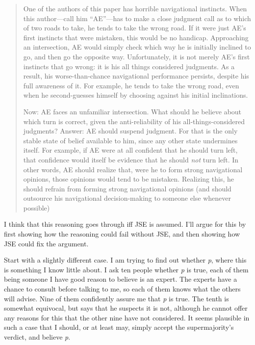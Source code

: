 \documentclass[
  10pt,
  letterpaper,
  DIV=11,
  numbers=noendperiod,
  twoside]{scrartcl}
\begin{document}
\begin{quote}
One of the authors of this paper has horrible navigational instincts.
When this author---call him ``AE''---has to make a close judgment call
as to which of two roads to take, he tends to take the wrong road. If it
were just AE's first instincts that were mistaken, this would be no
handicap. Approaching an intersection, AE would simply check which way
he is initially inclined to go, and then go the opposite way.
Unfortunately, it is not merely AE's first instincts that go wrong: it
is his all things considered judgments. As a result, his
worse-than-chance navigational performance persists, despite his full
awareness of it. For example, he tends to take the wrong road, even when
he second-guesses himself by choosing against his initial inclinations.

Now: AE faces an unfamiliar intersection. What should he believe about
which turn is correct, given the anti-reliability of his
all-things-considered judgments? Answer: AE should suspend judgment. For
that is the only stable state of belief available to him, since any
other state undermines itself. For example, if AE were at all confident
that he should turn left, that confidence would itself be evidence that
he should \emph{not} turn left. In other words, AE should realize that,
were he to form strong navigational opinions, those opinions would tend
to be mistaken. Realizing this, he should refrain from forming strong
navigational opinions (and should outsource his navigational
decision-making to someone else whenever possible)
\end{quote}

I think that this reasoning goes through iff JSE is assumed. I'll argue
for this by first showing how the reasoning could fail without JSE, and
then showing how JSE could fix the argument.

Start with a slightly different case. I am trying to find out whether
\emph{p}, where this is something I know little about. I ask ten people
whether \emph{p} is true, each of them being someone I have good reason
to believe is an expert. The experts have a chance to consult before
talking to me, so each of them knows what the others will advise. Nine
of them confidently assure me that \emph{p} is true. The tenth is
somewhat equivocal, but says that he suspects it is not, although he
cannot offer any reasons for this that the other nine have not
considered. It seems plausible in such a case that I should, or at least
may, simply accept the supermajority's verdict, and believe \emph{p}.
\end{document}
